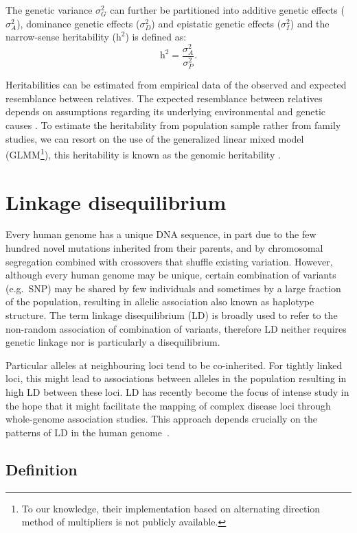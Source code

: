 \documentclass[]{book}
\let\rmarkdownfootnote\footnote%
\def\footnote{\protect\rmarkdownfootnote}
\begin{document}
The genetic variance \(\sigma^2_G\) can further be partitioned into
additive genetic effects (\(\sigma^2_A\)), dominance genetic effects
(\(\sigma^2_D\)) and epistatic genetic effects (\(\sigma^2_I\)) and the
narrow-sense heritability (\(\text{h}^2\)) is defined as:
\[\text{h}^2 = \frac{\sigma^2_A}{\sigma^2_P}.\]

Heritabilities can be estimated from empirical data of the observed and
expected resemblance between relatives. The expected resemblance between
relatives depends on assumptions regarding its underlying environmental
and genetic causes \citep{visscher_heritability_2008}. To estimate the
heritability from population sample rather from family studies, we can
resort on the use of the generalized linear mixed model (GLMM\footnote{To our knowledge, their implementation based on alternating
  direction method of multipliers is not publicly available.}), this
heritability is known as the genomic heritability \citep{dandine2015use}.

\hypertarget{LD}{%
\section{Linkage disequilibrium}\label{LD}}

Every human genome has a unique DNA sequence, in part due to the few
hundred novel mutations inherited from their parents, and by chromosomal
segregation combined with crossovers that shuffle existing variation.
However, although every human genome may be unique, certain combination
of variants (e.g.~SNP) may be shared by few individuals and sometimes by
a large fraction of the population, resulting in allelic association
also known as haplotype structure. The term linkage disequilibrium (LD)
is broadly used to refer to the non-random association of combination of
variants, therefore LD neither requires genetic linkage nor is
particularly a disequilibrium.

Particular alleles at neighbouring loci tend to be co-inherited. For
tightly linked loci, this might lead to associations between alleles in
the population resulting in high LD between these loci. LD has recently
become the focus of intense study in the hope that it might facilitate
the mapping of complex disease loci through whole-genome association
studies. This approach depends crucially on the patterns of LD in the
human genome~\citep{ardlie_patterns_2002}.

\hypertarget{definition}{%
\subsection{Definition}\label{definition}}
\end{document}
